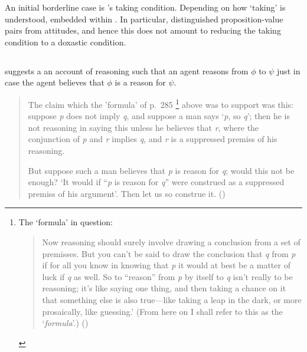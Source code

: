 \begin{note}
  An initial borderline case is \citeauthor{Boghossian:2014aa}'s taking condition.
  Depending on how `taking' is understood, embedded within \ros{}.
  In particular, distinguished proposition-value pairs from attitudes, and hence this does not amount to reducing the taking condition to a doxastic condition.
\end{note}

\subsection*{\textcite{Thomson:1965vv}}

\begin{note}
  \citeauthor{Thomson:1965vv} suggests a an account of reasoning such that an agent reasons from \(\phi\) to \(\psi\) just in case the agent believes that \(\phi\) is a reason for \(\psi\).
  \begin{quote}
    The claim which the 'formula' of p.\ 285\nolinebreak
    \footnote{
      The `formula' in question:
      \begin{quote}
        Now reasoning should surely involve drawing a conclusion from a set of premisses.
        But you can't be said to draw the conclusion that \emph{q} from \emph{p} if for all you know in knowing that \emph{p} it would at best be a matter of luck if \emph{q} as well.
        So to ``reason'' from \emph{p} by itself to \emph{q} isn't really to be reasoning; it's like saying one thing, and then taking a chance on it that something else is also true---like taking a leap in the dark, or more prosaically, like guessing.'
        (From here on I shall refer to this as the `\emph{formula}'.)\nolinebreak
        \mbox{}\hfill\mbox{(\citeyear[285]{Thomson:1965vv})}
      \end{quote}
    }
    above was to support was this:
    suppose \emph{p} does not imply \emph{q}, and suppose a man says `\emph{p}, so \emph{q}';
    then he is not reasoning in saying this unless he believes that \emph{r}, where the conjunction of \emph{p} and \emph{r} implies \emph{q}, and \emph{r} is a suppressed premiss of his reasoning.\par
    But suppose such a man believes that \emph{p} is reason for \emph{q}; would this not be enough?
    `It would if ``\emph{p} is reason for \emph{q}'' were construed as a suppressed premiss of his argument'.
    Then let us so construe it.%
    \mbox{}\hfill\mbox{(\citeyear[294]{Thomson:1965vv})}
  \end{quote}
\end{note}

